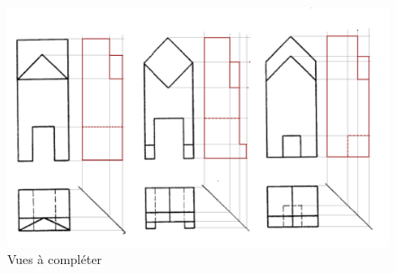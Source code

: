 {\begin{figure}[!h]
\includegraphics[width=\linewidth]{img/vues_a_completer2_cor}
\caption{\label{vues_a_completer}Vues à compléter}
\end{figure}
}



